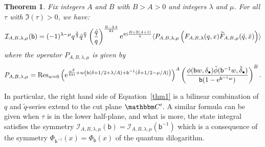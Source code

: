 \documentclass[12pt,reqno]{amsart}
\newtheorem{theorem}{Theorem}
\theoremstyle{definition}
\def\BC{\mathbbm C}
\def\calI{\mathcal I}
\def\calI{\mathcal I}
\def\tq{\tilde{q}}
\def\Res{\mathrm{Res}}
\def\bb{\mathsf{b}}
\def\ri{\mathrm{i}}
\def\wt{\widetilde}
\def\tx{\tilde{x}}
\def\vev#1{\langle #1 \rangle}
\def\re{{\rm e}}
\def\ri{{\rm i}}
\begin{document}
  \begin{theorem}
    \label{thm.state}
    Fix integers $A$ and $B$ with $B > A > 0$ and integers $\lambda$ and
    $\mu$. For all $\tau$ with $\Im(\tau)>0$, we have:
\begin{equation}
\label{thm1}
    \calI_{A,B,\lambda,\mu}(\bb) =
    (-1)^{\lambda-\mu} q^{\frac{\lambda}{2}}\tq^{\frac{\mu}{2}}
    \left(\frac{\tq}{q}\right)^{\frac{B-3A}{24}}
    \re^{\pi\ri\frac{B+2(A+1)}{4}}
    \vev{P_{A,B,\lambda,\mu}
      \left(F_{A,B,\lambda}(q,x)\wt{F}_{A,B,\mu}(\tq,\tx)\right)}
  \end{equation}
where the operator $P_{A,B,\lambda,\mu}$ is given by
\begin{equation}
  \label{Plm}
    P_{A,B,\lambda,\mu} = \Res_{w=0}
    \left(
      \re^{\frac{w^2}{4\pi\ri}+w\left(\bb(\delta+1/2+\lambda/A)
          +\bb^{-1}(\tilde{\delta}+1/2-\mu/A)\right)}
    \right)^A
    \left(\frac{\phi(\bb w,\delta_\bullet)
        \tilde{\phi}(\bb^{-1}w,\tilde{\delta}_\bullet)}
      {\bb(1-\re^{\bb^{-1}w})}\right)^B .
  \end{equation}
  \end{theorem}
  In particular, the right hand side of Equation~\eqref{thm1} is a
  bilinear combination of $q$ and $\tq$-series extend to the cut plane
  $\BC'$. A similar formula can be given when $\tau$ is in the lower
  half-plane, and what is more, the state integral satisfies the
  symmetry
  $\calI_{A,B,\lambda,\mu}(\bb) = \calI_{A,B,\lambda,\mu}(\bb^{-1})$
  which is a consequence of the symmetry
  $\Phi_{\bb^{-1}}(x)=\Phi_{\bb}(x)$ of the quantum dilogarithm.
  
\end{document}
